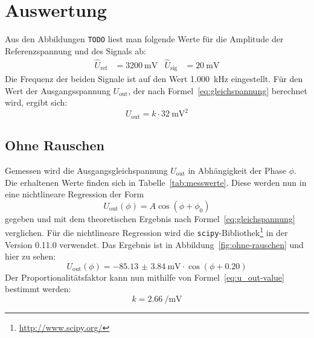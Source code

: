
\section{Auswertung}

Aus den Abbildungen \texttt{TODO} liest man folgende Werte für die
Amplitude der Referenzspannung und des Signals ab:
%
\begin{align}
  \widehat{U}_\text{ref} &= \SI{3200}{\milli\volt} &
  \widehat{U}_\text{sig} &= \SI{20}{\milli\volt}
\end{align}
%
Die Frequenz der beiden Signale ist auf den Wert \SI{1.000}{\kilo\hertz}
eingestellt. Für den Wert der Ausgangsspannung $U_\text{out}$, der nach
Formel~\eqref{eq:gleichspannung} berechnet wird, ergibt sich:
\begin{equation}
  \label{eq:u_out-value}
  U_\text{out} = k \cdot \SI{32}{\milli\volt\squared}
\end{equation}

\subsection{Ohne Rauschen}

Gemessen wird die Ausgangsgleichspannung $U_\text{out}$ in Abhängigkeit
der Phase $\phi$. Die erhaltenen Werte finden sich in
Tabelle~\ref{tab:messwerte}. Diese werden nun in eine nichtlineare
Regression der Form
%
\begin{equation}
  \label{eq:cos-regress}
  U_\text{out}(\phi) = A\cos(\phi+\phi_0)
\end{equation}
%
gegeben und mit dem theoretischen Ergebnis nach
Formel~\eqref{eq:gleichspannung} verglichen. Für die nichtlineare
Regression wird die
\texttt{scipy}-Bibliothek\footnote{\url{http://www.scipy.org/}} in der
Version 0.11.0 verwendet. Das Ergebnis ist in
Abbildung~\ref{fig:ohne-rauschen} und hier zu sehen:
%
\begin{equation}
  \label{eq:cos-regress-result}
  U_\text{out}(\phi) = \SI{-85.13(384)}{\milli\volt} \cdot
  \cos(\phi + \num{0.20})
\end{equation}
%
Der Proportionalitätsfaktor kann nun mithilfe von
Formel~\eqref{eq:u_out-value} bestimmt werden:
%
\begin{equation}
  \label{eq:propt-value}
  k = \SI{2.66}{\per\milli\volt}
\end{equation}

